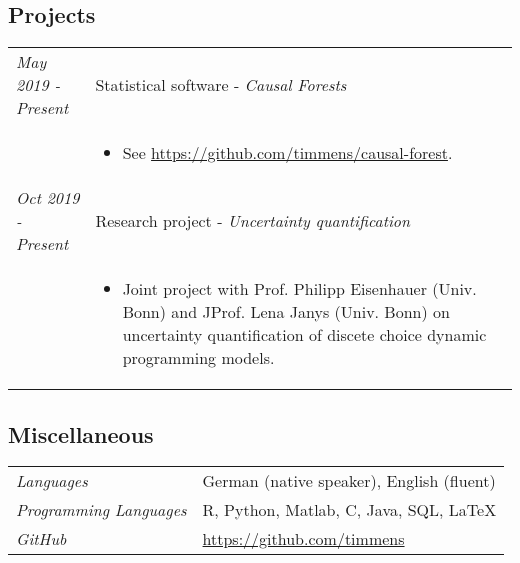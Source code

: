 \documentclass{article}
\begin{document}
\subsection*{Projects}

\begin{table}[h!]
\renewcommand{\arraystretch}{1.25}
    \begin{tabular}{p{125pt} p{350pt}}
      \textit{May 2019 - Present} & Statistical software - \emph{Causal Forests}\\
    \hfill & \vspace*{-13pt} \small{\begin{itemize} \item See \url{https://github.com/timmens/causal-forest}.\end{itemize}}\\
       \textit{Oct 2019 - Present} & Research project - \emph{Uncertainty quantification}\\
     \hfill & \vspace*{-13pt} \small{\begin{itemize} \item Joint project with Prof. Philipp Eisenhauer (Univ. Bonn) and JProf. Lena Janys (Univ. Bonn) on uncertainty quantification of discete choice dynamic programming models. \end{itemize}}
    \end{tabular}
\end{table}


\subsection*{Miscellaneous}

\begin{table}[h!]
\renewcommand{\arraystretch}{1.25}
    \begin{tabular}{p{125pt} p{350pt}}
         \textit{Languages} &  German (native speaker), English (fluent) \\ %
         \textit{Programming Languages} & \textsf{R}, Python, Matlab, C, Java, SQL, \LaTeX \\
         \textit{GitHub} & \url{https://github.com/timmens}
    \end{tabular}
  \end{table}

% 
\end{document}
